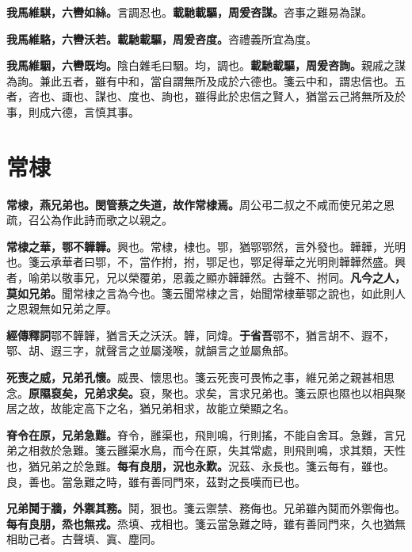 \textbf{我馬維騏，六轡如絲。}{\footnotesize 言調忍也。}\textbf{載馳載驅，周爰咨謀。}{\footnotesize 咨事之難易為謀。}

\textbf{我馬維駱，六轡沃若。載馳載驅，周爰咨度。}{\footnotesize 咨禮義所宜為度。}

\textbf{我馬維駰，六轡既均。}{\footnotesize 陰白雜毛曰駰。均，調也。}\textbf{載馳載驅，周爰咨詢。}{\footnotesize 親戚之謀為詢。兼此五者，雖有中和，當自謂無所及成於六德也。箋云中和，謂忠信也。五者，咨也、諏也、謀也、度也、詢也，雖得此於忠信之賢人，猶當云己將無所及於事，則成六德，言慎其事。}

\section{常棣}


\textbf{常棣，燕兄弟也。閔管蔡之失道，故作常棣焉。}{\footnotesize 周公弔二叔之不咸而使兄弟之恩疏，召公為作此詩而歌之以親之。}

\textbf{常棣之華，鄂不韡韡。}{\footnotesize 興也。常棣，棣也。鄂，猶鄂鄂然，言外發也。韡韡，光明也。箋云承華者曰鄂，不，當作拊，拊，鄂足也，鄂足得華之光明則韡韡然盛。興者，喻弟以敬事兄，兄以榮覆弟，恩義之顯亦韡韡然。古聲不、拊同。}\textbf{凡今之人，莫如兄弟。}{\footnotesize 聞常棣之言為今也。箋云聞常棣之言，始聞常棣華鄂之說也，如此則人之恩親無如兄弟之厚。}

\begin{quoting}\textbf{經傳釋詞}鄂不韡韡，猶言夭之沃沃。韡，同煒。\textbf{于省吾}鄂不，猶言胡不、遐不，鄂、胡、遐三字，就聲言之並屬淺喉，就韻言之並屬魚部。\end{quoting}

\textbf{死喪之威，兄弟孔懷。}{\footnotesize 威畏、懷思也。箋云死喪可畏怖之事，維兄弟之親甚相思念。}\textbf{原隰裒矣，兄弟求矣。}{\footnotesize 裒，聚也。求矣，言求兄弟也。箋云原也隰也以相與聚居之故，故能定高下之名，猶兄弟相求，故能立榮顯之名。}

\textbf{脊令在原，兄弟急難。}{\footnotesize 脊令，雝渠也，飛則鳴，行則搖，不能自舍耳。急難，言兄弟之相救於急難。箋云雝渠水鳥，而今在原，失其常處，則飛則鳴，求其類，天性也，猶兄弟之於急難。}\textbf{每有良朋，況也永歎。}{\footnotesize 況茲、永長也。箋云每有，雖也。良，善也。當急難之時，雖有善同門來，茲對之長嘆而已也。}

\textbf{兄弟鬩于牆，外禦其務。}{\footnotesize 鬩，狠也。箋云禦禁、務侮也。兄弟雖內鬩而外禦侮也。}\textbf{每有良朋，烝也無戎。}{\footnotesize 烝填、戎相也。箋云當急難之時，雖有善同門來，久也猶無相助己者。古聲填、寘、塵同。}

